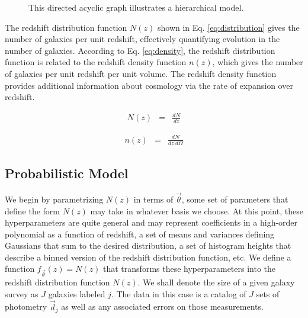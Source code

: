 \documentclass[preprint]{aastex}
\begin{document}
\begin{figure}
\vspace{0.5cm}
\begin{center}
\caption{This directed acyclic graph illustrates a hierarchical model.}
\label{fig:flow}
\end{center}
\end{figure}

The redshift distribution function $N(z)$ shown in Eq. \ref{eq:distribution} gives the number of galaxies per unit redshift, effectively quantifying evolution in the number of galaxies.  \citep{men13}  According to Eq. \ref{eq:density}, the redshift distribution function is related to the redshift density function $n(z)$, which gives the number of galaxies per unit redshift per unit volume.  The redshift density function provides additional information about cosmology via the rate of expansion over redshift.

\begin{eqnarray}
\label{eq:distribution}
N(z) &=& \frac{dN}{dz}
\end{eqnarray}

\begin{eqnarray}
\label{eq:density}
n(z) &=& \frac{dN}{dz\ d\Omega}
\end{eqnarray}

\clearpage
\subsection{Probabilistic Model}
\label{sec:prob}

We begin by parametrizing $N(z)$ in terms of $\vec{\theta}$, some set of parameters that define the form $N(z)$ may take in whatever basis we choose.  At this point, these hyperparameters are quite general and may represent coefficients in a high-order polynomial as a function of redshift, a set of means and variances defining Gaussians that sum to the desired distribution, a set of histogram heights that describe a binned version of the redshift distribution function, etc.  We define a function $f_{\vec{\theta}}(z)=N(z)$ that transforms these hyperparameters into the redshift distribution function $N(z)$.  We shall denote the size of a given galaxy survey as $J$ galaxies labeled $j$.  The data in this case is a catalog of $J$ sets of photometry $\vec{d}_{j}$ as well as any associated errors on those measurements.  
\end{document}
